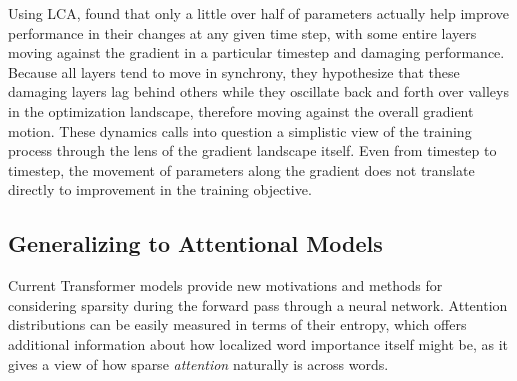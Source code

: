Using LCA, \citet{lan_lca:_2019} found that only a little over half of parameters actually help improve performance in their changes at any given time step, with some entire layers moving against the gradient in a particular timestep and damaging performance. Because all layers tend to move in synchrony, they hypothesize that these damaging layers lag behind others while they oscillate back and forth over valleys in the optimization landscape, therefore moving against the overall gradient motion. These dynamics calls into question a simplistic view of the training process through the lens of the gradient landscape itself. Even from timestep to timestep, the movement of parameters along the gradient does not translate directly to improvement in the training objective.

\subsection{Generalizing to Attentional Models}

Current Transformer models provide new motivations and methods for considering sparsity during the forward pass through a neural network. Attention distributions can be easily measured in terms of their entropy, which offers additional information about how localized word importance itself might be, as it gives a view of how sparse \textit{attention} naturally is across words.